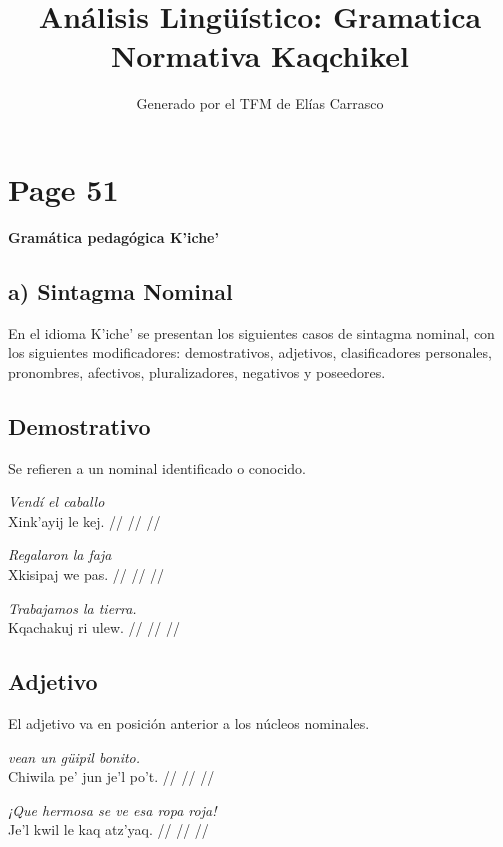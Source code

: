 \documentclass{article}%
\title{Análisis Lingüístico: Gramatica Normativa Kaqchikel}%
\author{Generado por el TFM de Elías Carrasco}%
\begin{document}
%
\normalsize%
\maketitle%
\section{Page 51}%
\label{sec:Page51}%
\centerline{\textbf{Gramática pedagógica K’iche’}}%
\subsection{a) Sintagma Nominal}%
\label{subsec:a)SintagmaNominal}%

%
En el idioma K’iche’ se presentan los siguientes casos de sintagma nominal, con los siguientes modificadores: demostrativos, adjetivos, clasificadores personales, pronombres, afectivos, pluralizadores, negativos y poseedores. %
\subsection{Demostrativo}%
\label{subsec:Demostrativo}%

%
Se refieren a un nominal identificado o conocido. %
\par\medskip%
\ex
\textit{Vendí el caballo} \\
\begingl
\gla Xink’ayij le kej. //
\glb  //
\glc  //
\endgl
\xe
%
\medskip%
\par\medskip%
\ex
\textit{Regalaron la faja} \\
\begingl
\gla Xkisipaj we pas. //
\glb  //
\glc  //
\endgl
\xe
%
\medskip%
\par\medskip%
\ex
\textit{Trabajamos la tierra.} \\
\begingl
\gla Kqachakuj ri ulew. //
\glb  //
\glc  //
\endgl
\xe
%
\medskip%
\subsection{Adjetivo}%
\label{subsec:Adjetivo}%

%
El adjetivo va en posición anterior a los núcleos nominales. %
\par\medskip%
\ex
\textit{vean un güipil bonito.} \\
\begingl
\gla Chiwila pe’ jun je’l po’t. //
\glb  //
\glc  //
\endgl
\xe
%
\medskip%
\par\medskip%
\ex
\textit{¡Que hermosa se ve esa ropa roja!} \\
\begingl
\gla Je’l kwil le kaq atz’yaq. //
\glb  //
\glc  //
\endgl
\xe
%
\medskip%
\end{document}
